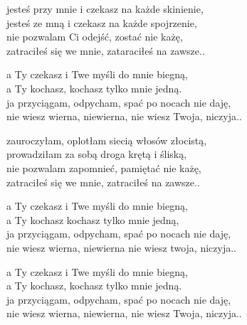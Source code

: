 \begin{text}
    jesteś przy mnie i czekasz na każde skinienie,\\
    jesteś ze mną i czekasz na każde spojrzenie,\\
    nie pozwalam Ci odejść, zostać nie każę,\\
    zatraciłeś się we mnie, zataraciłeś na zawsze..

    a Ty czekasz i Twe myśli do mnie biegną,\\
    a Ty kochasz, kochasz tylko mnie jedną.\\
    ja przyciągam, odpycham, spać po nocach nie daję,\\
    nie wiesz wierna, niewierna, nie wiesz Twoja, niczyja..

    zauroczyłam, oplotłam siecią włosów złocistą,\\
    prowadziłam za sobą droga krętą i śliską,\\
    nie pozwalam zapomnieć, pamiętać nie każę,\\
    zatraciłeś się we mnie, zatraciłeś na zawsze..

    a Ty czekasz i Twe myśli do mnie biegną,\\
    a Ty kochasz kochasz tylko mnie jedną,\\
    ja przyciągam, odpycham, spać po nocach nie daję,\\
    nie wiesz wierna, niewierna nie wiesz twoja, niczyja..

    a Ty czekasz i Twe myśli do mnie biegną,\\
    a Ty kochasz, kochasz tylko mnie jedną.\\
    ja przyciągam, odpycham, spać po nocach nie daję,\\
    nie wiesz wierna, niewierna, nie wiesz Twoja, niczyja..
\end{text}
\begin{chord}

\end{chord}